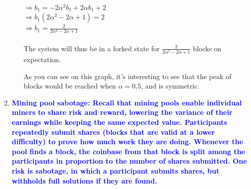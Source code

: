 \documentclass[11pt]{article}
\begin{document}
\begin{enumerate}
\begin{enumerate}
        \\ $\Rightarrow b_1 = -2 \alpha^2 b_1 + 2 \alpha b_1 + 2$
        \\ $\Rightarrow b_1(2 \alpha^2 - 2 \alpha + 1) = 2$
        \\ $\Rightarrow b_1 = \frac{2}{2 \alpha^2 - 2 \alpha + 1}$
        \\\\ The system will thus be in a forked state for $\frac{2}{2 \alpha^2 - 2 \alpha + 1}$ blocks on expectation.
        \newline
        \newline
        \newline
        As you can see on this graph, it's interesting to see that the peak of blocks would be reached when $\alpha = 0.5$, and is symmetric.
    \end{enumerate}

\item \textbf{\textcolor{blue}{Mining pool sabotage: Recall that mining pools enable individual miners to share risk and reward, lowering the variance of their earnings while keeping the same expected value. Participants repeatedly submit shares (blocks that are valid at a lower difficulty) to prove how much work they are doing. Whenever the pool finds a block, the coinbase from that block is split among the participants in proportion to the number of shares submitted. One risk is sabotage, in which a participant submits shares, but withholds full solutions if they are found.}}


\end{enumerate}
\end{document}
